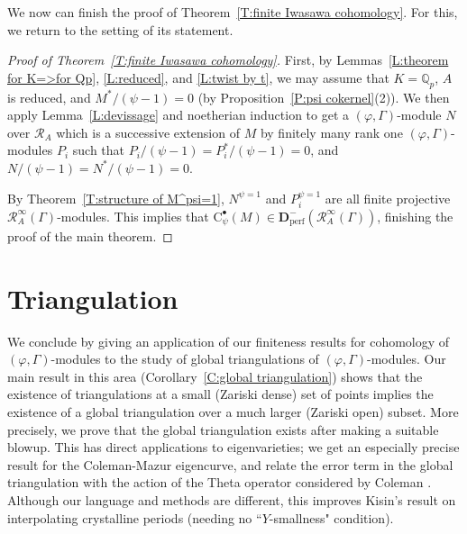 \documentclass[12pt]{article}
\theoremstyle{definition}
\numberwithin{equation}{theorem}
\newcommand{\calR}{\mathcal{R}}
\newcommand{\QQ}{\mathbb{Q}}
\newcommand{\bbD}{\mathbf{D}}
\newcommand{\rmC}{\mathrm{C}}
\newcommand{\perf}{\mathrm{perf}}
\def\Qp{\QQ_p}
\begin{document}
We now can finish the proof of Theorem~\ref{T:finite Iwasawa cohomology}.  For this, we return to the setting of its statement.

\begin{proof}[Proof of Theorem~\ref{T:finite Iwasawa cohomology}]  
\label{Proof:finite Iwasawa cohomology}
First, by Lemmas~\ref{L:theorem for K=>for Qp}, \ref{L:reduced}, and \ref{L:twist by t}, we may assume that $K=\Qp$, $A$ is reduced, and $M^*/(\psi-1) = 0$ (by Proposition~\ref{P:psi cokernel}(2)).
We then apply Lemma~\ref{L:devissage} and noetherian induction to get a $(\varphi, \Gamma)$-module $N$ over $\calR_A$ which is a successive extension of $M$ by finitely many rank one $(\varphi, \Gamma)$-modules $P_i$ such that $P_i/(\psi-1) = P_i^*/(\psi-1) = 0$, and $N/(\psi-1) = N^*/(\psi-1)=0$.

By Theorem~\ref{T:structure of M^psi=1}, $N^{\psi=1}$ and $P_i^{\psi=1}$ are all finite projective $\calR_A^\infty(\Gamma)$-modules.  This implies that $\rmC^\bullet_\psi(M) \in \bbD_\perf^-(\calR_A^\infty(\Gamma))$, finishing the proof of the main theorem.
\end{proof}

\section{Triangulation}
\label{S:triangulation}

We conclude by giving an application of our finiteness results for
cohomology of $(\varphi, \Gamma)$-modules to the study of global
triangulations of $(\varphi, \Gamma)$-modules. Our main result in this
area (Corollary~\ref{C:global triangulation}) shows that the existence
of triangulations at a small (Zariski dense) set of points implies the
existence of a global triangulation over a much larger (Zariski open)
subset.  More precisely, we prove that the global triangulation exists
after making a suitable blowup.  This has direct applications to
eigenvarieties; we get an especially precise result for the
Coleman-Mazur eigencurve, and relate the error term in the global
triangulation with the action of the Theta operator considered by
Coleman \cite{coleman}.  Although our language and methods are
different, this improves Kisin's result \cite{R:Kisin} on
interpolating crystalline periods (needing no ``$Y$-smallness"
condition).
\end{document}
